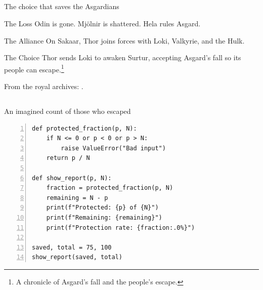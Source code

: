\subsection{\returntitle}
\begin{frame}{\returntitle}{The choice that saves the Asgardians}
    \begin{block}{The Loss}
        Odin is gone. Mjölnir is shattered. Hela rules Asgard.
    \end{block}
    \begin{alertblock}{The Alliance}
        On Sakaar, Thor joins forces with Loki, Valkyrie, and the Hulk.
    \end{alertblock}
    \begin{exampleblock}{The Choice}
        Thor sends Loki to awaken Surtur, accepting Asgard's fall so its people can escape.\footnote{A chronicle of Asgard's fall and the people's escape.}
    \end{exampleblock}
    \medskip
    From the royal archives: \citet{lore_thor}.
\end{frame}

\subsection{\modeltitle}
\begin{frame}[fragile]{\modeltitle}{An imagined count of those who escaped}
    \begin{SlideCenteredCode}
        \begin{Verbatim}[fontsize=\footnotesize,numbers=left,numbersep=5pt]
def protected_fraction(p, N):
    if N <= 0 or p < 0 or p > N:
        raise ValueError("Bad input")
    return p / N

def show_report(p, N):
    fraction = protected_fraction(p, N)
    remaining = N - p
    print(f"Protected: {p} of {N}")
    print(f"Remaining: {remaining}")
    print(f"Protection rate: {fraction:.0%}")

saved, total = 75, 100
show_report(saved, total)
      \end{Verbatim}
    \end{SlideCenteredCode}
\end{frame}

